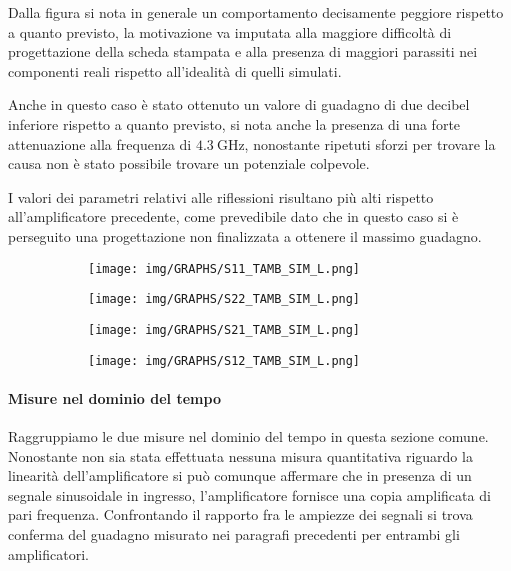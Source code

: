 \documentclass[12pt,oneside]{book}
\begin{document}
Dalla figura si nota in generale un comportamento decisamente peggiore rispetto a quanto previsto, la motivazione va imputata alla maggiore difficoltà di progettazione della scheda stampata e alla presenza di maggiori parassiti nei componenti reali rispetto all'idealità di quelli simulati.

Anche in questo caso è stato ottenuto un valore di guadagno di due decibel inferiore rispetto a quanto previsto, si nota anche la presenza di una forte attenuazione alla frequenza di $\SI{4.3}{\giga\hertz}$, nonostante ripetuti sforzi per trovare la causa non è stato possibile trovare un potenziale colpevole.

I valori dei parametri relativi alle riflessioni risultano più alti rispetto all'amplificatore precedente, come prevedibile dato che in questo caso si è perseguito una progettazione non finalizzata a ottenere il massimo guadagno.

\begin{figure}[!htbp]
    \centering
    \begin{subfigure}[t]{0.48\textwidth}
        \centering
        \texttt{[image: img/GRAPHS/S11\_TAMB\_SIM\_L.png]}
        \caption{}
    \end{subfigure}
    \hfill
    \begin{subfigure}[t]{0.48\textwidth}
        \centering
        \texttt{[image: img/GRAPHS/S22\_TAMB\_SIM\_L.png]}
        \caption{}
    \end{subfigure}
    \hfill
    \centering
    \begin{subfigure}[t]{0.48\textwidth}
        \centering
        \texttt{[image: img/GRAPHS/S21\_TAMB\_SIM\_L.png]}
        \caption{}
    \end{subfigure}
    \hfill
    \begin{subfigure}[t]{0.48\textwidth}
        \centering
        \texttt{[image: img/GRAPHS/S12\_TAMB\_SIM\_L.png]}
        \caption{}
    \end{subfigure}
    \hfill
\end{figure}

\paragraph{Misure nel dominio del tempo}

Raggruppiamo le due misure nel dominio del tempo in questa sezione comune.
Nonostante non sia stata effettuata nessuna misura quantitativa riguardo la linearità dell'amplificatore si può comunque affermare che in presenza di un segnale sinusoidale in ingresso, l'amplificatore fornisce una copia amplificata di pari frequenza. Confrontando il rapporto fra le ampiezze dei segnali si trova conferma del guadagno misurato nei paragrafi precedenti per entrambi gli amplificatori.
\end{document}
